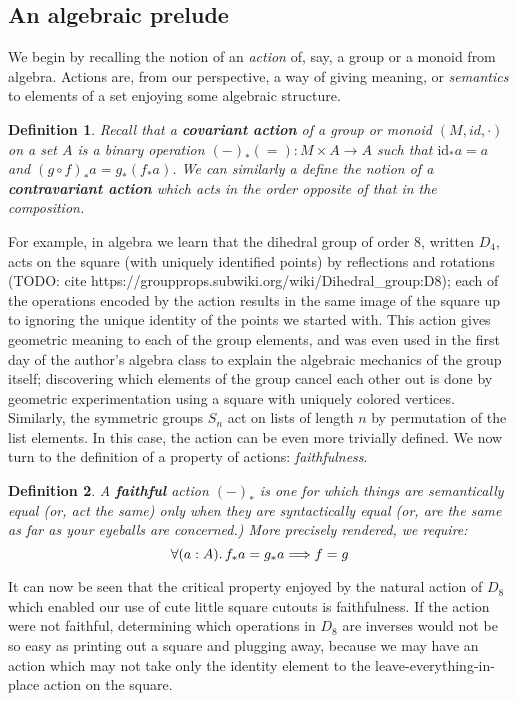 \documentclass[12pt,twoside]{reedthesis}
\newtheorem{definition}{Definition}
\begin{document}
\subsection{An algebraic prelude}
We begin by recalling the notion of an \emph{action} of, say, a group or a
monoid from algebra. Actions are, from our perspective, a way of giving meaning,
or \emph{semantics} to elements of a set enjoying some algebraic structure.
\begin{definition}
  Recall that a \textbf{covariant action} of a group or monoid \((M, id, \cdot)\) on a
  set \(A\) is a binary operation \((-)_* (=) : M ‌\times A \rightarrow A\) such that
  \(\text{id}_* a = a\) and \( (g \circ f)_* a = g_* (f_* a) \). We can similarly a
  define the notion of a \textbf{contravariant action} which acts in the order
  opposite of that in the composition.
\end{definition}
For example, in algebra we learn that the dihedral group of order 8, written
$D_{4}$, acts on the square (with uniquely identified points) by reflections and
rotations (TODO: cite https://groupprops.subwiki.org/wiki/Dihedral\_group:D8);
each of the operations encoded by the action results in the same image of the
square up to ignoring the unique identity of the points we started with. This
action gives geometric meaning to each of the group elements, and was even used
in the first day of the author's algebra class to explain the algebraic
mechanics of the group itself; discovering which elements of the group cancel
each other out is done by geometric experimentation using a square with uniquely
colored vertices. Similarly, the symmetric groups $S_{n}$ act on lists of length
$n$ by permutation of the list elements. In this case, the action can be even
more trivially defined. We now turn to the definition of a property of actions:
\emph{faithfulness}.

\begin{definition} A \textbf{faithful} action $(-)_{*}$ is one for which things
  are semantically equal (or, act the same) only when they are syntactically
  equal (or, are the same as far as your eyeballs are concerned.) More precisely
  rendered, we require: \[ \forall (a:A)\ldotp f_* a = g_* a \Longrightarrow f = g \]
\end{definition}

It can now be seen that the critical property enjoyed by the natural action of
$D_{8}$ which enabled our use of cute little square cutouts is faithfulness. If
the action were not faithful, determining which operations in $D_{8}$ are
inverses would not be so easy as printing out a square and plugging away,
because we may have an action which may not take only the identity element to
the leave-everything-in-place action on the square.
\end{document}
